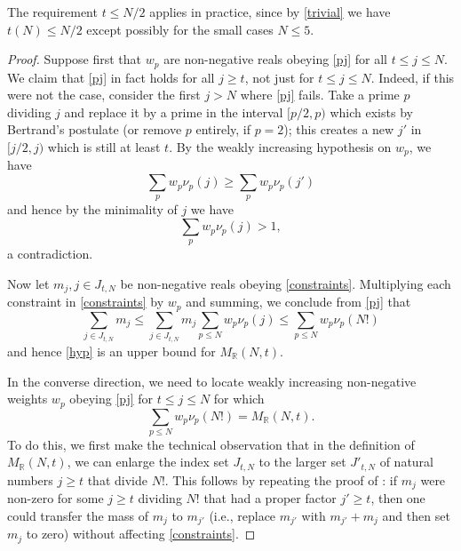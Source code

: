 \documentclass[12pt,a4paper,reqno]{amsart}
\numberwithin{equation}{section}
\theoremstyle{plain}
\theoremstyle{definition}
\newcommand\R{\mathbb{R}}
\begin{document}
The requirement $t \leq N/2$ applies in practice, since by \eqref{trivial} we have $t(N) \leq N/2$ except possibly for the small cases $N \leq 5$.

\begin{proof}  Suppose first that $w_p$ are non-negative reals obeying \eqref{pj} for all $t \leq j \leq N$.
We claim that \eqref{pj} in fact holds for all $j \geq t$, not just for $t \leq j \leq N$.  Indeed, if this were not the case, consider the first $j > N$ where \eqref{pj} fails.  Take a prime $p$ dividing $j$ and replace it by a prime in the interval $[p/2,p)$ which exists by Bertrand's postulate (or remove $p$ entirely, if $p=2$); this creates a new $j'$ in $[j/2,j)$ which is still at least $t$.  By the weakly increasing hypothesis on $w_p$, we have
  $$ \sum_p w_p \nu_p(j) \geq \sum_p w_p \nu_p(j')$$
  and hence by the minimality of $j$ we have
  $$ \sum_p w_p \nu_p(j) > 1,$$
  a contradiction.

Now let $m_j, j \in J_{t,N}$ be non-negative reals obeying \eqref{constraints}.  Multiplying each constraint in \eqref{constraints} by $w_p$ and summing, we conclude from \eqref{pj} that
$$ \sum_{j \in J_{t,N}} m_j  \leq \sum_{j \in J_{t,N}} m_j \sum_{p \leq N} w_p \nu_p(j) \leq \sum_{p \leq N} w_p \nu_p(N!)$$
and hence \eqref{hyp} is an upper bound for $M_\R(N,t)$.

In the converse direction, we need to locate weakly increasing non-negative weights $w_p$ obeying \eqref{pj} for $t \leq j \leq N$ for which
\begin{equation}\label{wpm} 
  \sum_{p \leq N} w_p \nu_p(N!) = M_\R(N,t).
\end{equation}
To do this, we first make the technical observation that in the definition of $M_\R(N,t)$, we can enlarge the index set $J_{t,N}$ to the larger set $J'_{t,N}$ of natural numbers $j \geq t$ that divide $N!$.  This follows by repeating the proof of : if $m_j$ were non-zero for some $j \geq t$ dividing $N!$ that had a proper factor $j' \geq t$, then one could transfer the mass of $m_j$ to $m_{j'}$ (i.e., replace $m_{j'}$ with $m_{j'}+m_j$ and then set $m_j$ to zero) without affecting \eqref{constraints}.  


\end{proof}
\end{document}

